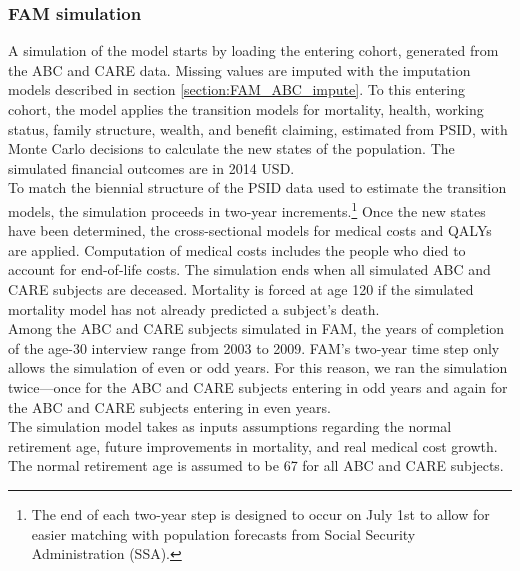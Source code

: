


\subsubsection{FAM simulation}

\noindent A simulation of the model starts by loading the entering cohort, generated from the ABC and CARE data. Missing values are imputed with the imputation models described in section \ref{section:FAM_ABC_impute}.  To this entering cohort, the model applies the transition models for mortality, health, working status, family structure, wealth, and benefit claiming, estimated from PSID, with Monte Carlo decisions to calculate the new states of the population.
The simulated financial outcomes are in 2014 USD. \\


\noindent To match the biennial structure of the PSID data used to estimate the transition models, the simulation proceeds in two-year increments.\footnote{The end of each two-year step is designed to occur on July 1st to allow for easier matching with population forecasts from Social Security Administration (SSA).}
Once the new states have been determined, the cross-sectional models for medical costs and QALYs are applied.
Computation of medical costs includes the people who died to account for end-of-life costs.
The simulation ends when all simulated ABC and CARE subjects are deceased. Mortality is forced at age 120 if the simulated mortality model has not already predicted a subject's death. \\

\noindent Among the ABC and CARE subjects simulated in FAM, the years of completion of the age-30 interview range from 2003 to 2009.
FAM's two-year time step only allows the simulation of even or odd years.
For this reason, we ran the simulation twice---once for the ABC and CARE subjects entering in odd years and again for the ABC and CARE subjects entering in even years. \\

\noindent The simulation model takes as inputs assumptions regarding the normal retirement age, future improvements in mortality, and real medical cost growth.
The normal retirement age is assumed to be 67 for all ABC and CARE subjects. \\

